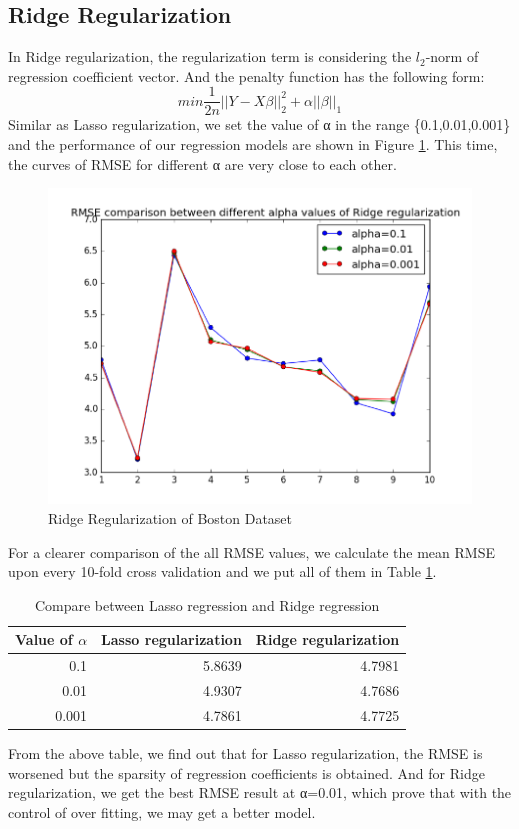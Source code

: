 \documentclass{article}
\begin{document}
\subsection{Ridge Regularization}
In Ridge regularization, the regularization term is considering the $l_2$-norm of regression coefficient vector. And the penalty function has the following form:
\begin{equation*}
min\frac{1}{2n}||Y-X\beta||^2_2+\alpha||\beta||_1
\end{equation*}
Similar as Lasso regularization, we set the value of α in the range \{0.1,0.01,0.001\} and the performance of our regression models are shown in Figure  \ref{fig:rr}. This time, the curves of RMSE for different α are very close to each other.
\begin{figure}[htbp]
\centering
\includegraphics[width=.6\textwidth]{rr.png}
\caption{Ridge Regularization of Boston Dataset}
\label{fig:rr}
\end{figure}
For a clearer comparison of the all RMSE values, we calculate the mean RMSE upon every 10-fold cross validation and we put all of them in Table \ref{tb}.
\begin{table}
\begin{center}
\caption{Compare between Lasso regression and Ridge regression }
\label{tb}
\begin{tabular}{|r|r|r|}
\hline
Value of $\alpha$ & Lasso regularization & Ridge regularization\\
\hline
0.1&5.8639&4.7981\\
0.01&4.9307&4.7686\\
0.001&4.7861&4.7725\\
\hline 	
\end{tabular}
\end{center}
\end{table}
From the above table, we find out that for Lasso regularization, the RMSE is worsened but the sparsity of regression coefficients is obtained. And for Ridge regularization, we get the best RMSE result at α=0.01, which prove that with the control of over fitting, we may get a better model.
\end{document}
